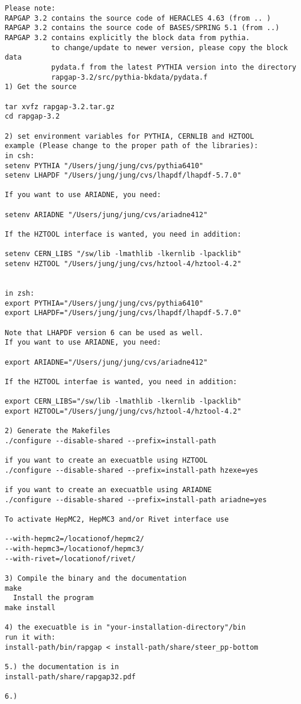 \documentclass[10pt]{article} \usepackage{dina4}
\begin{document}
\begin{verbatim}
Please note:
RAPGAP 3.2 contains the source code of HERACLES 4.63 (from .. )
RAPGAP 3.2 contains the source code of BASES/SPRING 5.1 (from ..)
RAPGAP 3.2 contains explicitly the block data from pythia.
           to change/update to newer version, please copy the block data
           pydata.f from the latest PYTHIA version into the directory
           rapgap-3.2/src/pythia-bkdata/pydata.f
1) Get the source

tar xvfz rapgap-3.2.tar.gz
cd rapgap-3.2

2) set environment variables for PYTHIA, CERNLIB and HZTOOL
example (Please change to the proper path of the libraries):
in csh: 
setenv PYTHIA "/Users/jung/jung/cvs/pythia6410"
setenv LHAPDF "/Users/jung/jung/cvs/lhapdf/lhapdf-5.7.0"

If you want to use ARIADNE, you need:

setenv ARIADNE "/Users/jung/jung/cvs/ariadne412"

If the HZTOOL interface is wanted, you need in addition:

setenv CERN_LIBS "/sw/lib -lmathlib -lkernlib -lpacklib"
setenv HZTOOL "/Users/jung/jung/cvs/hztool-4/hztool-4.2"


in zsh:
export PYTHIA="/Users/jung/jung/cvs/pythia6410"
export LHAPDF="/Users/jung/jung/cvs/lhapdf/lhapdf-5.7.0"

Note that LHAPDF version 6 can be used as well.
If you want to use ARIADNE, you need:

export ARIADNE="/Users/jung/jung/cvs/ariadne412"

If the HZTOOL interfae is wanted, you need in addition:

export CERN_LIBS="/sw/lib -lmathlib -lkernlib -lpacklib"
export HZTOOL="/Users/jung/jung/cvs/hztool-4/hztool-4.2"

2) Generate the Makefiles
./configure --disable-shared --prefix=install-path

if you want to create an execuatble using HZTOOL 
./configure --disable-shared --prefix=install-path hzexe=yes

if you want to create an execuatble using ARIADNE
./configure --disable-shared --prefix=install-path ariadne=yes

To activate HepMC2, HepMC3 and/or Rivet interface use 

--with-hepmc2=/locationof/hepmc2/
--with-hepmc3=/locationof/hepmc3/
--with-rivet=/locationof/rivet/

3) Compile the binary and the documentation
make
  Install the program
make install

4) the execuatble is in "your-installation-directory"/bin
run it with:
install-path/bin/rapgap < install-path/share/steer_pp-bottom

5.) the documentation is in
install-path/share/rapgap32.pdf

6.) 
\end{verbatim}
\end{document}
